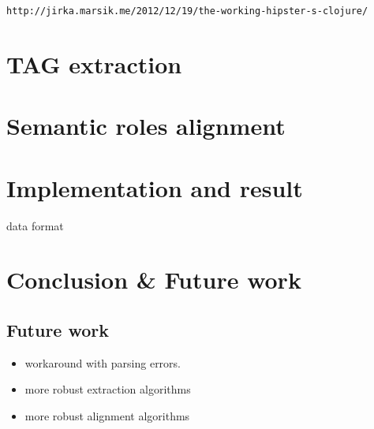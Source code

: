 \documentclass[a4paper]{article}
\begin{document}
\texttt{http://jirka.marsik.me/2012/12/19/the-working-hipster-s-clojure/}

\section{TAG extraction}
\section{Semantic roles alignment}
\section{Implementation and result}
data format
\section{Conclusion \& Future work}
\subsection{Future work}
\begin{itemize}
    \item workaround with parsing errors.
    \item more robust extraction algorithms
    \item more robust alignment algorithms
\end{itemize}
\end{document}
